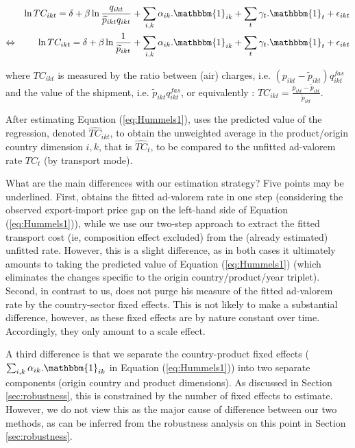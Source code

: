 \documentclass[a4paper,11pt]{article}
\begin{document}
\begin{eqnarray}
&&\ln TC_{ikt} = \delta+ \beta \ln \frac{q_{ikt}}{\widetilde{p}_{ikt}q_{ikt}} + \sum_{i,k}\alpha_{ik}.\mathbbm{1}_{ik}+ \sum_{t}\gamma_{t}.\mathbbm{1}_{t} + \epsilon_{ikt} \notag \\
\Leftrightarrow && \ln TC_{ikt} = \delta+ \beta \ln \frac{1}{\widetilde{p}_{ikt}} + \sum_{i,k}\alpha_{ik}.\mathbbm{1}_{ik}+ \sum_{t}\gamma_{t}.\mathbbm{1}_{t} + \epsilon_{ikt} \label{eq:Hummels1}
\end{eqnarray}

\noindent where $TC_{ikt}$ is measured by the ratio between (air) charges, i.e.
$(p_{ikt} - \widetilde{p}_{ikt})q^{fas}_{ikt}$ and the value of the shipment, i.e.
$\widetilde{p}_{ikt}q^{fas}_{ikt}$, or equivalently : $TC_{ikt} = \frac{p_{ikt} - \widetilde{p}_{ikt}}{\widetilde{p}_{ikt}}$.\medskip

After estimating Equation (\ref{eq:Hummels1}), \cite{hummels2007} uses the predicted value of the regression, denoted $\widehat{TC}_{ikt}$, to obtain the unweighted average in the product/origin country dimension $i,k$, that is $\widehat{TC}_{t}$, to be compared to the unfitted ad-valorem rate $TC_{t}$ (by transport mode).\medskip

What are the main differences with our estimation strategy? Five points may be underlined.
First, \cite{hummels2007} obtains the fitted ad-valorem rate in one step (considering the observed export-import price gap on the left-hand side of Equation (\ref{eq:Hummels1})), while we use our two-step approach to extract the fitted transport cost (ie, composition effect excluded) from the (already estimated) unfitted rate.
However, this is a slight difference, as in both cases it ultimately amounts to taking the predicted value of Equation (\ref{eq:Hummels1}) (which eliminates the changes specific to the origin country/product/year triplet).
Second, in contrast to us, \cite{hummels2007} does not purge his measure of the fitted ad-valorem rate by the country-sector fixed effects.
This is not likely to make a substantial difference, however, as these fixed effects are by nature constant over time. Accordingly, they only amount to a scale effect.

A third difference is that we separate the country-product fixed effects ($\sum_{i,k}\alpha_{ik}.\mathbbm{1}_{ik}$ in Equation (\ref{eq:Hummels1})) into two separate components (origin country and product dimensions).
As discussed in Section \ref{sec:robustness}, this is constrained by the number of fixed effects to estimate.
However, we do not view this as the major cause of difference between our two methods, as can be inferred from the robustness analysis on this point in Section \ref{sec:robustness}.
\end{document}
